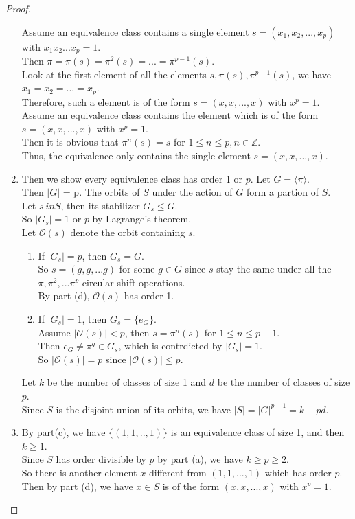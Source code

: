 \documentclass[14pt]{amsart}
\newcommand{\llo}{\mathcal{O}}
\newcommand{\bbz}{\mathbb{Z}}
\theoremstyle{plain}
\theoremstyle{definition}
\begin{document}
\begin{proof}
\begin{enumerate}
	  Assume an equivalence class contains a single element $s=(x_1,x_2,...,x_p)$ with $x_1x_2...x_p=1$.\\
	  Then $\pi= \pi(s) = \pi^2(s) = ...=\pi^{p-1}(s)$.\\
	  Look at the first element of all the elements $s,\pi(s),\pi^{p-1}(s)$, we have $x_1=x_2=...=x_p$.\\
	  Therefore, such a element is of the form $s=(x,x,...,x)$ with $x^p = 1$.\\
	  Assume an equivalence class contains the element which is of the form $s=(x,x,...,x)$ with $x^p=1$.\\
	  Then it is obvious that $\pi^n(s) = s$ for $1 \leq n \leq p, n\in \bbz$.\\
	  Thus, the equivalence only contains the single element $s = (x,x,...,x)$.
	\item
	   Then we show every equivalence class has order 1 or $p$.
		Let $G = \langle \pi \rangle$.\\
		Then $|G|$ = p.
	  	The orbits of $S$ under the action of $G$ form a partion of $S$.\\
	  	Let $s\ in S$, then its stabilizer $G_s \leq G$.\\
	  	So $|G_s| = 1$ or $p$ by Lagrange’s theorem.\\
	  	Let $\llo(s)$ denote the orbit containing $s$.
	  	\begin{enumerate}
	  		\item
	  		  If $|G_s|= p$, then $G_s = G$. \\
	  		  So $s = (g,g,...g)$ for some $g \in G$ since $s$ stay the same under all the $\pi,\pi^2,...\pi^p$ circular shift operations.\\
	  		  By part (d), $\llo(s)$ has order 1.
	  		  \item
	  		  	If $|G_s|= 1$, then $G_s = \{e_G\}$. \\
	  		  	Assume $|\llo(s)| < p$, then $s = \pi^n(s)$ for $1 \leq n \leq p-1$.\\
	  		  	Then $e_G \neq \pi^q \in G_s$, which is contrdicted by $|G_s| = 1$.\\
	  		  	So $|\llo(s)| = p$ since $|\llo(s)| \leq p$.
		\end{enumerate}
	 Let $k$ be the number of classes of size 1 and $d$ be the number of classes of size $p$.\\
	 Since $S$ is the disjoint union of its orbits, we have $|S| = |G|^{p-1} = k+pd$.
	\item 
	By part(c), we have $\{(1,1,..,1)\}$ is an equivalence class of size 1, and then $k \geq 1$.\\
	Since $S$ has order divisible by $p$ by part (a), we have $k \geq p \geq 2$.\\
	So there is another element $x$ different from $(1,1,...,1)$ which has order $p$.\\
	Then by part (d), we have $x\in S$ is of the form $(x,x,...,x)$ with $x^p = 1$.
  \end{enumerate}
\end{proof}
\end{document}
